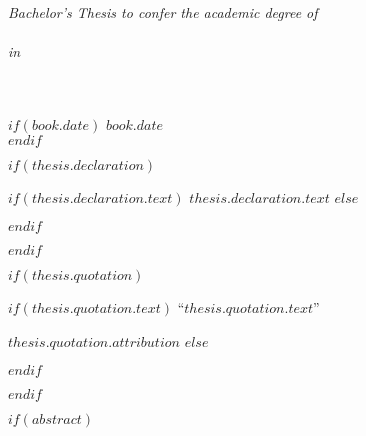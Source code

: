 \begin{titlepage}
\begin{center}
\vfill

\large \textit{Bachelor's Thesis to confer the academic degree of\\ \degreename}\\[0.3cm] %
\textit{in}\\[0.4cm]
\textbf{\groupname}\\
\href{$thesis.supervisor.url$}{\deptname}\\[2cm] %

\vfill

$if(book.date)$
{\large $book.date$}\\[4cm] %
$endif$

\vfill
\end{center}
\end{titlepage}

$if(thesis.declaration)$
\begin{declaration}
\addchaptertocentry{\authorshipname} %
$if(thesis.declaration.text)$
$thesis.declaration.text$
$else$

$endif$

\end{declaration}

\cleardoublepage
$endif$

$if(thesis.quotation)$

\vspace*{0.2\textheight}

$if(thesis.quotation.text)$
\noindent``{\itshape $thesis.quotation.text$}''\bigbreak

\hfill $thesis.quotation.attribution$
$else$

$endif$

$endif$

$if(abstract)$

\begin{abstract}
\addchaptertocentry{\abstractname} %
$abstract$
\end{abstract}

